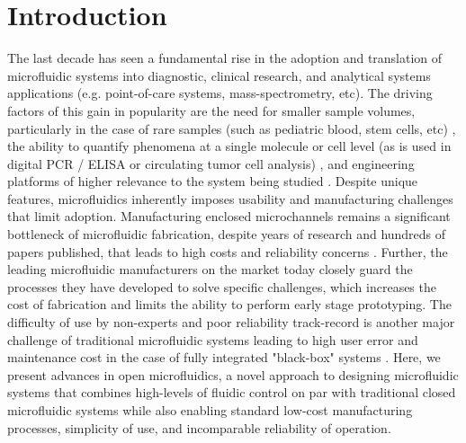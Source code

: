 \section{Introduction}
The last decade has seen a fundamental rise in the adoption and translation of microfluidic systems into diagnostic, clinical research, and analytical systems applications (e.g. point-of-care systems, mass-spectrometry, etc). The driving factors of this gain in popularity are the need for smaller sample volumes, particularly in the case of rare samples (such as pediatric blood, stem cells, etc) \cite{Burns1998, Ingham2007,Song2006a,Thorsen2002a}, the ability to quantify phenomena at a single molecule or cell level (as is used in digital PCR / ELISA or circulating tumor cell analysis) \cite{Hong2012,Kopp1998,Song2006a}, and engineering platforms of higher relevance to the system being studied \cite{Berthier2010, Domenech2009, Huh2010a,Jeon2015,Meyvantsson2008a,Moraes2013,Sackmann2014a}. Despite unique features, microfluidics inherently imposes usability and manufacturing challenges that limit adoption. Manufacturing enclosed microchannels remains a significant bottleneck of microfluidic fabrication, despite years of research and hundreds of papers published, that leads to high costs and reliability concerns \cite{Guckenberger2015,Sackmann2014,Shiu2008RapidEmbossing}. Further, the leading microfluidic manufacturers on the market today closely guard the processes they have developed to solve specific challenges, which increases the cost of fabrication and limits the ability to perform early stage prototyping. The difficulty of use by non-experts and poor reliability track-record is another major challenge of traditional microfluidic systems leading to high user error and maintenance cost in the case of fully integrated "black-box" systems \cite{Casavant2013,Sackmann2014}. Here, we present advances in open microfluidics, a novel approach to designing microfluidic systems that combines high-levels of fluidic control on par with traditional closed microfluidic systems while also enabling standard low-cost manufacturing processes, simplicity of use, and incomparable reliability of operation.

